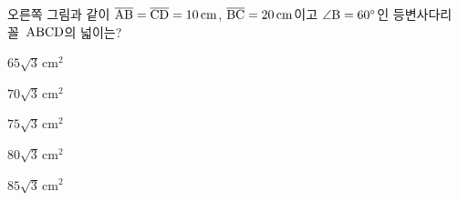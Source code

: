 \noindent\begin{minipage}[t]{0.58\linewidth}\vspace{0pt}\raggedright 오른쪽 그림과 같이 $\overline{\mathrm{AB}}=\overline{\mathrm{CD}}=10\,\mathrm{cm}$, $\overline{\mathrm{BC}}=20\,\mathrm{cm}$이고 $\angle\mathrm{B}=60^\circ$인 등변사다리꼴~$\mathrm{ABCD}$의 넓이는?\end{minipage}\hfill\begin{minipage}[t]{0.4\linewidth}\vspace{0pt}\centering \resizebox{\ifdim\width>\linewidth\linewidth\else\width\fi}{!}{}\end{minipage}\par
\begin{choices32}{\rule[-3ex]{0pt}{8ex}$65\sqrt{3}\,\mathrm{cm}^2$}{\rule[-3ex]{0pt}{8ex}$70\sqrt{3}\,\mathrm{cm}^2$}{\rule[-3ex]{0pt}{8ex}$75\sqrt{3}\,\mathrm{cm}^2$}{\rule[-3ex]{0pt}{8ex}$80\sqrt{3}\,\mathrm{cm}^2$}{\rule[-3ex]{0pt}{8ex}$85\sqrt{3}\,\mathrm{cm}^2$}\end{choices32}
